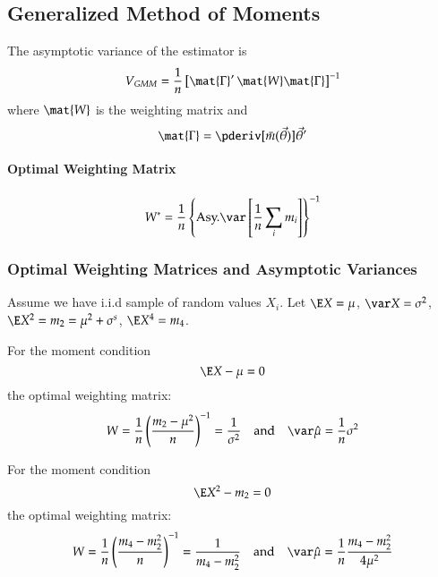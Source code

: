 \documentclass[a4paper]{article}
\numberwithin{equation}{subsection}
\begin{document}
\subsection{Generalized Method of Moments}
\label{sec:gmm}

The asymptotic variance of the estimator is
\begin{equation}
  V_{GMM} = \frac{1}{n} 
  \left[ \mat{\Gamma}' \, \mat{W} \mat{\Gamma} \right]^{-1}
\end{equation}
where $\mat{W}$ is the weighting matrix and 
\begin{equation}
  \mat{\Gamma} = \pderiv[\bar m(\vec{\theta})]{\vec{\theta}'}
\end{equation}

\paragraph{Optimal Weighting Matrix}

\begin{equation}
  W^{*} = \frac{1}{n} 
  \left\{\text{Asy.} \var \left[\frac{1}{n} \sum_{i} m_{i} \right] \right\}^{-1}
\end{equation}


\subsubsection{Optimal Weighting Matrices and Asymptotic Variances}
\label{sec:optimalW}

Assume we have i.i.d sample of random values $X_{i}$.
Let $\E X = \mu$, $\var X = \sigma^{2}$, $\E X^{2} = m_{2} = \mu^{2}
+ \sigma^{s}$, $\E X^{4} = m_{4}$.  

For the moment condition
\begin{equation}
  \E X - \mu = 0
\end{equation}
the optimal weighting matrix:
\begin{equation}
  W = 
  \frac{1}{n} \left(\frac{m_{2} - \mu^{2}}{n} \right)^{-1}
  =
  \frac{1}{\sigma^{2}}
  \quad\text{and}\quad
  \var \hat\mu = \frac{1}{n} \sigma^{2}
\end{equation}

For the moment condition
\begin{equation}
  \E X^{2} - m_{2} = 0
\end{equation}
the optimal weighting matrix:
\begin{equation}
  W = 
  \frac{1}{n} \left(\frac{m_{4} - m_{2}^{2}}{n} \right)^{-1}
  =
  \frac{1}{m_{4} - m_{2}^{2}}
  \quad\text{and}\quad
  \var \hat\mu = \frac{1}{n} \frac{m_{4} - m_{2}^{2}}{4\mu^{2}}
\end{equation}
\end{document}
